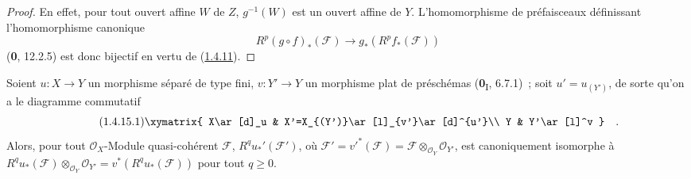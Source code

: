 \begin{proof}
En effet, pour tout ouvert affine $W$ de $Z$, $g^{-1}(W)$ est un ouvert
affine de $Y$. L'homomorphisme de préfaisceaux définissant l'homomorphisme
canonique
\[
R^p(g\circ f)_*(\mathcal F)\longrightarrow g_*(R^pf_*(\mathcal F))
\]
(\textbf{0}, 12.2.5) est donc bijectif en vertu de
(\hyperref[III.1.4.11-fr]{1.4.11}).
\end{proof}

\begin{proposition}[1.4.15]
\label{III.1.4.15-fr}
Soient $u:X\to Y$ un morphisme séparé de type fini, $v:Y'\to Y$ un
morphisme plat de préschémas \textup{(\textbf{0}\textsubscript{I}, 6.7.1)}~; soit
$u'=u_{(Y')}$, de sorte qu'on a le diagramme commutatif
\begin{equation}
\label{III.1.4.15.1-fr}
\tag{1.4.15.1}
\xymatrix{
X\ar[d]_u & X'=X_{(Y')}\ar[l]_{v'}\ar[d]^{u'}\\
Y & Y'\ar[l]^v
}\quad.
\end{equation}
Alors, pour tout $\mathcal O_X$-Module quasi-cohérent $\mathcal F$,
$R^qu_*'(\mathcal F')$, où
$\mathcal F'=v'^*(\mathcal F)=\mathcal F\otimes_{\mathcal O_Y}\mathcal O_{Y'}$,
est canoniquement isomorphe à
$R^qu_*(\mathcal F)\otimes_{\mathcal O_Y}\mathcal O_{Y'}
=v^*(R^qu_*(\mathcal F))$ pour tout $q\geq0$.
\end{proposition}

